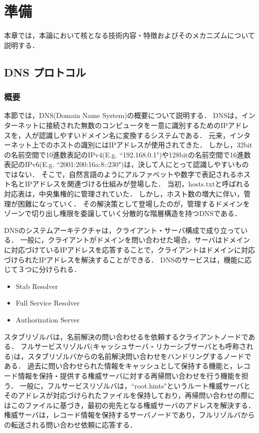 \section{準備}
本章では，本論において核となる技術内容・特徴およびそのメカニズムについて説明する．
\subsection{DNS プロトコル}
\label{sec:dns-protocol}
\subsubsection{概要}
本節では，DNS(Domain Name System)の概要について説明する．
DNSは，インターネットに接続された無数のコンピュータを一意に識別するためのIPアドレスを，人が認識しやすいドメイン名に変換するシステムである．
元来，インターネット上でのホストの識別にはIPアドレスが使用されてきた．
しかし，32bitの名前空間で10進数表記のIPv4(E.g. ``192.168.0.1")や128bitの名前空間で16進数表記のIPv6(E.g. ``2001:200:16a:8::230")は，決して人にとって認識しやすいものではない．
そこで，自然言語のようにアルファベットや数字で表記されるホスト名とIPアドレスを関連づける仕組みが登場した．
当初，hosts.txtと呼ばれる対応表は，中央集権的に管理されていた．
しかし，ホスト数の増大に伴い，管理が困難になっていく．
その解決策として登場したのが，管理するドメインをゾーンで切り出し権限を委譲していく分散的な階層構造を持つDNSである．

DNSのシステムアーキテクチャは，クライアント・サーバ構成で成り立っている．
一般に，クライアントがドメインを問い合わせた場合，サーバはドメインに対応づけているIPアドレスを応答することで，クライアントはドメインに対応づけられたIPアドレスを解決することができる．
DNSのサービスは，機能に応じて３つに分けられる．
\begin{itemize}
 \item Stab Resolver
 \vspace{-3mm}
 \item Full Service Resolver
 \vspace{-3mm}
 \item Authorization Server
\end{itemize}

スタブリゾルバは，名前解決の問い合わせるを依頼するクライアントノードである．
フルサービスリゾルバ(キャッシュサーバ・リカーシブサーバとも呼称される)は，スタブリゾルバからの名前解決問い合わせをハンドリングするノードである．
過去に問い合わせられた情報をキャッシュとして保持する機能と，レコード情報を保持・提供する権威サーバに対する再帰問い合わせを行う機能を担う．
一般に，フルサービスリゾルバは，``root.hints"というルート権威サーバとそのアドレスが対応づけられたファイルを保持しており，再帰問い合わせの際にはこのファイルに基づき，最初の宛先となる権威サーバのアドレスを解決する．
権威サーバは，レコード情報を保持するサーバノードであり，フルリゾルバからの転送される問い合わせ依頼に応答する．

